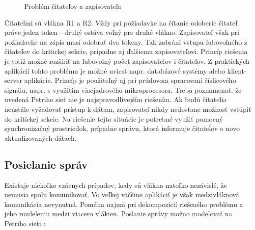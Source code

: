 \begin{figure}[ht]
\begin{center}
\begin{minipage}{1.1\linewidth}
\begin{center}


\caption {Problém čitateľov a zapisovateľa}
\label{obr1}
\end{center}
\end{minipage}
\end{center}
\end{figure}

Čitateľmi sú vlákna R1 a R2. Vždy pri požiadavke na čítanie odoberie čitateľ práve jeden token - druhý ostáva voľný pre druhé vlákno. Zapisovateľ však pri požiadavke na zápis musí odobrať dva tokeny. Tak zabráni vstupu ľubovoľného z čitateľov do kritickej sekcie, prípadne aj ďalšiemu zapisovateľovi. Princíp riešenia je totiž možné rozšíriť na ľubovoľný počet zapisovateľov i čitateľov.
Z praktických aplikácií tohto problému je možné uviesť napr. databázové systémy alebo klient-server aplikácie. Princíp je použiteľný aj pri prúdovom spracovaní číslicového signálu, napr. s využitím viacjadrového mikroprocesora. Treba poznamenať, že uvedená Petriho sieť nie je najspravodlivejším riešením. Ak budú čitatelia neustále vyžadovať prístup k dátam, zapisovateľ nikdy nedostane možnosť vstúpiť do kritickej sekcie. Na riešenie tejto situácie je potrebné využiť pomocný synchronizačný prostriedok, prípadne správu, ktorá informuje čitateĺov o novo aktualizovaných dátach.


\newpage

\subsection{Posielanie správ}

Existuje niekoľko vzácnych prípadov, kedy sú vlákna natoľko nezávislé, že nemusia spolu komunikovať. Vo veľkej väčšine aplikácií je však medzivláknová komunikácia nevynutná. Pomáha najmä pri dekompozícií riešeného problému a jeho rozdeleniu medzi viacero vlákien. Poslanie správy možno modelovať na Petriho sieti :

